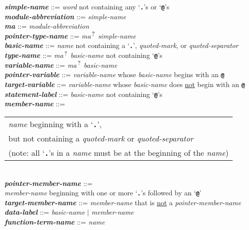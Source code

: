 \documentclass[12pt]{article}
\newcommand{\TT}[1]{{\tt \bfseries #1}}
\newcommand{\QMARK}{{$^{\,\mbox{\footnotesize ?}}$}}
\newcommand{\MA}{{\em ma}\QMARK}
\newcommand{\emkey}[1]{{\em \bfseries #1}}
\newenvironment{indpar}[1][0.3in]%
	{\begin{list}{}%
		     {\setlength{\itemsep}{0in}%
		      \setlength{\topsep}{0in}%
		      \setlength{\parsep}{1ex}%
		      \setlength{\labelwidth}{#1}%
		      \setlength{\leftmargin}{#1}%
		      \addtolength{\leftmargin}{\labelsep}}%
	 \item}%
	{\end{list}}
\begin{document}
\begin{indpar}
\emkey{simple-name} ::= {\em word} not containing any `\TT{.}'s or `\TT{@}'s \\
\emkey{module-abbreviation}\label{MODULE-ABBREVIATION} ::= {\em simple-name} \\
\emkey{ma} ::= {\em module-abbreviation} \\
\emkey{pointer-type-name}\label{POINTER-TYPE-NAME} ::=
    \MA{} {\em simple-name}
\\[1ex]
\emkey{basic-name}\label{BASIC-NAME} ::=
	    {\em name} not containing a `\TT{.}', {\em quoted-mark}, or
	    {\em quoted-separator} \\
\emkey{type-name}\label{TYPE-NAME} ::=
    \MA{} {\em basic-name} not containing `\TT{@}'s \\
\emkey{variable-name}\label{VARIABLE-NAME} ::=
    \MA{} {\em basic-name} \\
\emkey{pointer-variable}\label{POINTER-VARIABLE} ::=
    {\em variable-name} whose {\em basic-name} begins with an \TT{@} \\
\emkey{target-variable}\label{TARGET-VARIABLE} ::=
    {\em variable-name} whose {\em basic-name} does \underline{not}
    begin with an \TT{@} \\
\emkey{statement-label} ::= {\em basic-name}
    \label{STATEMENT-LABEL} not containing `\TT{@}'s
\\[1ex]
\emkey{member-name}\label{MEMBER-NAME}
	::= \begin{tabular}[t]{@{}l@{}}
                        {\em name} beginning with a `\TT{.}', \\
			but not containing a {\em quoted-mark} or
			    {\em quoted-separator} \\
			(note: all `\TT{.}'s in a {\em name} must be at
			 the beginning of the {\em name})
			\end{tabular} \\
\emkey{pointer-member-name}\label{POINTER-MEMBER-NAME} ::= \\
\hspace*{2em}
    {\em member-name} beginning with one or more `\TT{.}'s followed by
    an `\TT{@}' \\
\emkey{target-member-name}\label{TARGET-MEMBER-NAME} ::=
    {\em member-name} that is \underline{not} a {\em pointer-member-name}
\\[1ex]
\emkey{data-label}\label{DATA-LABEL} ::=
    {\em basic-name} $|$ {\em member-name}
\\[1ex]
\emkey{function-term-name} ::= {\em name}
    \label{FUNCTION-TERM-NAME}

\end{indpar}
\end{document}
